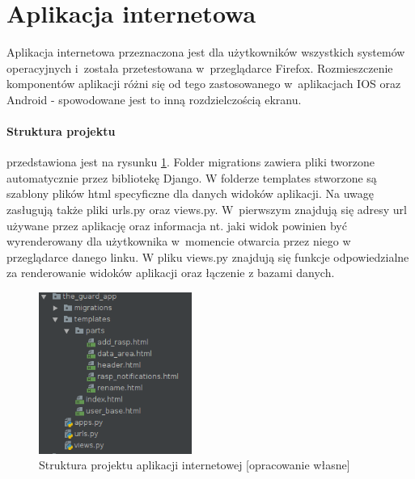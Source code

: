 \documentclass[polish,bachelor,a4paper,oneside]{ppfcmthesis}
\begin{document}
    \section{Aplikacja internetowa}
    Aplikacja internetowa przeznaczona jest dla użytkowników wszystkich systemów operacyjnych i~została przetestowana w~przeglądarce Firefox. Rozmieszczenie komponentów aplikacji różni się od tego zastosowanego w~aplikacjach IOS oraz Android - spowodowane jest to inną rozdzielczością ekranu.

    \paragraph{Struktura projektu} przedstawiona jest na rysunku \ref{web_struct}. Folder migrations zawiera pliki tworzone automatycznie przez bibliotekę Django. W folderze templates stworzone są szablony plików html specyficzne dla danych widoków aplikacji. Na uwagę zasługują także pliki urls.py oraz views.py. W~pierwszym znajdują się adresy url używane przez aplikację oraz informacja nt. jaki widok powinien być wyrenderowany dla użytkownika w~momencie otwarcia przez niego w przeglądarce danego linku. W pliku views.py znajdują się funkcje odpowiedzialne za renderowanie widoków aplikacji oraz łączenie z bazami danych.
    \begin{figure}[H]
        \centering
        \includegraphics[width=5cm]{web_screenshots/web_struct.png}
        \caption{Struktura projektu aplikacji internetowej [opracowanie własne]}
        \label{web_struct}
    \end{figure}
\end{document}
